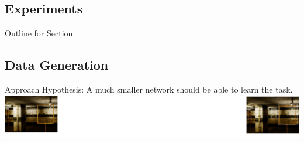 \documentclass{beamer}
\begin{document}
\begin{darkframes}
    \section{Experiments}
        \begin{frame}{Outline for Section \thesection}
    \tableofcontents[currentsection]
\end{frame}
  \subsection{Data Generation}
    \begin{frame}{Approach}
  Hypothesis: A much smaller network should be able to learn the task.
  \\ \bigskip \bigskip
	\includegraphics[width=\textwidth]{fig/approach}
    \end{frame}
    

\end{darkframes}
\end{document}
